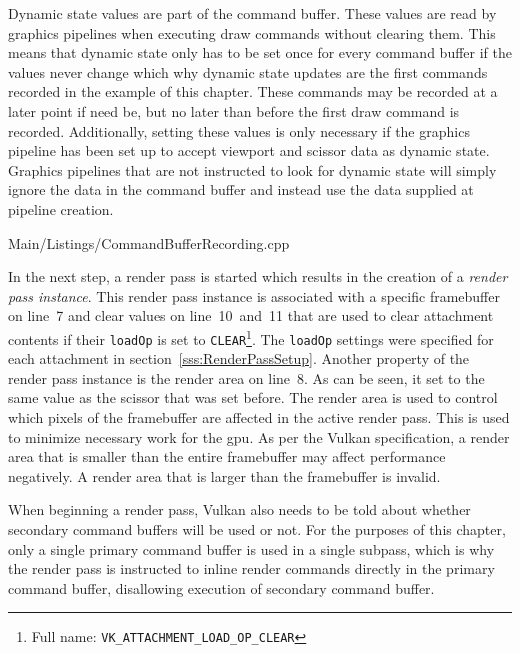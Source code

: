       Dynamic state values are part of the command buffer.
      These values are read by graphics pipelines when executing draw commands without clearing them.
      This means that dynamic state only has to be set once for every command buffer if the values never change which why dynamic state updates are the first commands recorded in the example of this chapter.
      These commands may be recorded at a later point if need be, but no later than before the first draw command is recorded.
      Additionally, setting these values is only necessary if the graphics pipeline has been set up to accept viewport and scissor data as dynamic state.
      Graphics pipelines that are not instructed to look for dynamic state will simply ignore the data in the command buffer and instead use the data supplied at pipeline creation.

      
      {Main/Listings/CommandBufferRecording.cpp}

      In the next step, a render pass is started which results in the creation of a \textit{render pass instance}.
      This render pass instance is associated with a specific framebuffer on line~7 and clear values on line~10~and~11 that are used to clear attachment contents if their \lstinline{loadOp} is set to \lstinline{CLEAR}\footnote{Full name: \lstinline{VK_ATTACHMENT_LOAD_OP_CLEAR}}.
      The \lstinline{loadOp} settings were specified for each attachment in section~\ref{sss:RenderPassSetup}.
      Another property of the render pass instance is the render area on line~8.
      As can be seen, it set to the same value as the scissor that was set before.
      The render area is used to control which pixels of the framebuffer are affected in the active render pass.
      This is used to minimize necessary work for the \gls{gpu}.
      As per the Vulkan specification, a render area that is smaller than the entire framebuffer may affect performance negatively.
      A render area that is larger than the framebuffer is invalid.

      When beginning a render pass, Vulkan also needs to be told about whether secondary command buffers will be used or not.
      For the purposes of this chapter, only a single primary command buffer is used in a single subpass, which is why the render pass is instructed to inline render commands directly in the primary command buffer, disallowing execution of secondary command buffer.

